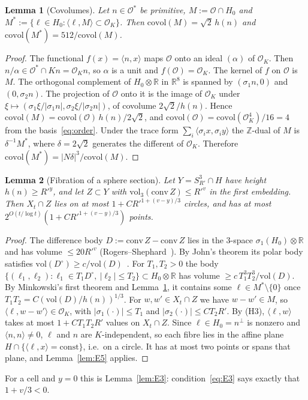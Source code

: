 \documentclass[aps,prx,twocolumn,superscriptaddress,nofootinbib,longbibliography]{revtex4-2}
\theoremstyle{plain}
\newtheorem{lemma}{Lemma}
\theoremstyle{definition}
\theoremstyle{remark}
\newcommand{\Z}{\mathbb{Z}}
\newcommand{\R}{\mathbb{R}}
\begin{document}
\begin{lemma}[Covolumes]\label{lem:F1}
Let $n\in\mathcal O^*$ be primitive, $M:=\mathcal O\cap H_0$ and $M^*:=\{\ell\in H_0:\langle\ell,M\rangle\subset\mathcal O_K\}$. Then $\mathrm{covol}(M)=\sqrt2\,h(n)$ and $\mathrm{covol}(M^*)=512/\mathrm{covol}(M)$.
\end{lemma}
\begin{proof}
The functional $f(x)=\langle n,x\rangle$ maps $\mathcal O$ onto an ideal $(\alpha)$ of $\mathcal O_K$. Then $n/\alpha\in\mathcal O^*\cap Kn=\mathcal O_Kn$, so $\alpha$ is a unit and $f(\mathcal O)=\mathcal O_K$. The kernel of $f$ on $\mathcal O$ is $M$. The orthogonal complement of $H_0\otimes\R$ in $\R^8$ is spanned by $(\sigma_1n,0)$ and $(0,\sigma_2n)$. The projection of $\mathcal O$ onto it is the image of $\mathcal O_K$ under $\xi\mapsto(\sigma_1\xi/|\sigma_1n|,\sigma_2\xi/|\sigma_2n|)$, of covolume $2\sqrt2/h(n)$. Hence $\mathrm{covol}(M)=\mathrm{covol}(\mathcal O)\,h(n)/2\sqrt2$, and $\mathrm{covol}(\mathcal O)=\mathrm{covol}(\mathcal O_K^4)/16=4$ from the basis~\eqref{eq:order}. Under the trace form $\sum_i\langle\sigma_ix,\sigma_iy\rangle$ the $\Z$-dual of $M$ is $\delta^{-1}M^*$, where $\delta=2\sqrt2$ generates the different of $\mathcal O_K$. Therefore $\mathrm{covol}(M^*)=|N\delta|^3/\mathrm{covol}(M)$.
\end{proof}

\begin{lemma}[Fibration of a sphere section]\label{lem:F2}
Let $Y=S^3_{R'}\cap H$ have height $h(n)\ge R'^y$, and let $Z\subset Y$ with $\mathrm{vol}_3(\mathrm{conv}\,Z)\le R'^v$ in the first embedding. Then $X_t\cap Z$ lies on at most $1+CR'^{1+(v-y)/3}$ circles, and has at most $2^{O(t/\log t)}(1+CR'^{1+(v-y)/3})$ points.
\end{lemma}
\begin{proof}
The difference body $D:=\mathrm{conv}\,Z-\mathrm{conv}\,Z$ lies in the $3$-space $\sigma_1(H_0)\otimes\R$ and has volume $\le20R'^v$ (Rogers--Shephard~\cite{RogersShephard}). By John's theorem its polar body satisfies $\mathrm{vol}(D^\circ)\ge c/\mathrm{vol}(D)$~\cite{Gruber}. For $T_1,T_2>0$ the body $\{(\ell_1,\ell_2):\ell_1\in T_1D^\circ,\ |\ell_2|\le T_2\}\subset H_0\otimes\R$ has volume $\ge c\,T_1^3T_2^3/\mathrm{vol}(D)$. By Minkowski's first theorem and Lemma~\ref{lem:F1}, it contains some $\ell\in M^*\setminus\{0\}$ once $T_1T_2=C(\mathrm{vol}(D)/h(n))^{1/3}$. For $w,w'\in X_t\cap Z$ we have $w-w'\in M$, so $\langle\ell,w-w'\rangle\in\mathcal O_K$, with $|\sigma_1(\cdot)|\le T_1$ and $|\sigma_2(\cdot)|\le CT_2R'$. By (H3), $\langle\ell,w\rangle$ takes at most $1+CT_1T_2R'$ values on $X_t\cap Z$. Since $\ell\in H_0=n^\perp$ is nonzero and $\langle n,n\rangle\ne0$, $\ell$ and $n$ are $K$-independent, so each fibre lies in the affine plane $H\cap\{\langle\ell,x\rangle=\mathrm{const}\}$, i.e.\ on a circle. It has at most two points or spans that plane, and Lemma~\ref{lem:E5} applies.
\end{proof}
For a cell and $y=0$ this is Lemma~\ref{lem:E3}: condition~\eqref{eq:E3} says exactly that $1+v/3<0$.
\end{document}
